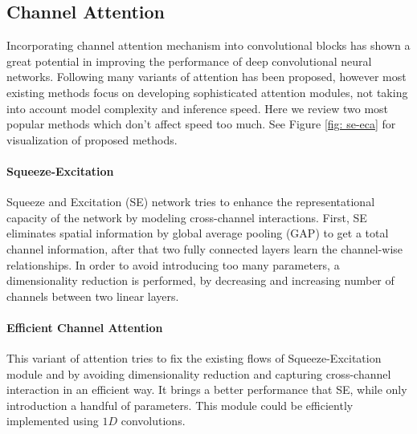 \subsection{Channel Attention}
Incorporating channel attention mechanism \cite{hu2018_squeeze_SE} \cite{wang2020_eca} into convolutional blocks has shown a great potential in improving the performance of deep convolutional neural networks. %
Following \cite{hu2018_squeeze_SE} many variants of attention has been proposed, however most existing methods focus on developing sophisticated attention modules, not taking into account model complexity and inference speed. Here we review two most popular methods which don't affect speed too much. See Figure \ref{fig: se-eca} for visualization of proposed methods.

\paragraph{Squeeze-Excitation}
Squeeze and Excitation (SE) network tries to enhance the representational capacity of the network by modeling cross-channel interactions. First, SE eliminates spatial information by global average pooling (GAP) to get a total channel information, after that two fully connected layers learn the channel-wise relationships. In order to avoid introducing too many parameters, a dimensionality reduction is performed, by decreasing and increasing number of channels between two linear layers. 

\paragraph{Efficient Channel Attention} This variant of attention tries to fix the existing flows of Squeeze-Excitation module and by avoiding dimensionality reduction and capturing cross-channel interaction in an efficient way. It brings a better performance that SE, while only introduction a handful of parameters. This module could be efficiently implemented using $1 D $ convolutions. 


